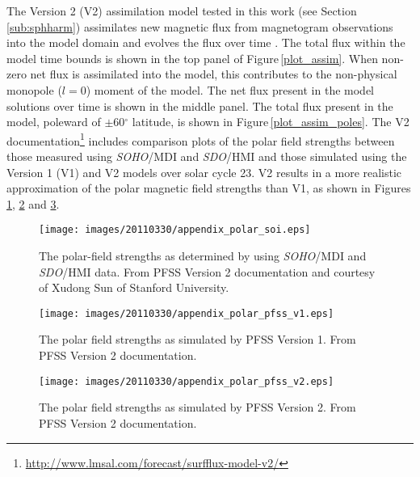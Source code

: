 \documentclass[namedreferences]{solarphysics}
\begin{document}
\begin{article}
The Version 2 (V2) assimilation model tested in this work (see Section\,\ref{sub:sphharm}) assimilates new magnetic flux from magnetogram observations into the model domain and evolves the flux over time \citep{Schrijver:2001,Schrijver:2001c}. The total flux within the model time bounds is shown in the top panel of Figure\,\ref{plot_assim}. When non-zero net flux is assimilated into the model, this contributes to the non-physical monopole ($l$$=$0) moment of the model. The net flux present in the model solutions over time is shown in the middle panel. The total flux present in the model, poleward of $\pm$60$^\circ$ latitude, is shown in Figure\,\ref{plot_assim_poles}. The V2 documentation\footnote{\url{http://www.lmsal.com/forecast/surfflux-model-v2/}} includes comparison plots of the polar field strengths between those measured using \emph{SOHO}/MDI and \emph{SDO}/HMI and those simulated using the Version 1 (V1) and V2 models over solar cycle 23. V2 results in a more realistic approximation of the polar magnetic field strengths than V1, as shown in Figures\,\ref{plot_soi_poles}, \ref{plot_pfss_poles_v1} and \ref{plot_pfss_poles_v2}.

\begin{figure}[!t]
\begin{center}
\texttt{[image: images/20110330/appendix\_polar\_soi.eps]}
\end{center}
\caption{The polar-field strengths as determined by using \emph{SOHO}/MDI and \emph{SDO}/HMI data. From PFSS Version 2 documentation and courtesy of Xudong Sun of Stanford University.}
\label{plot_soi_poles}
\end{figure}

\begin{figure}[!t]
\begin{center}
\texttt{[image: images/20110330/appendix\_polar\_pfss\_v1.eps]}
\end{center}
\caption{The polar field strengths as simulated by PFSS Version 1. From PFSS Version 2 documentation.}
\label{plot_pfss_poles_v1}
\end{figure}

\begin{figure}[!t]
\begin{center}
\texttt{[image: images/20110330/appendix\_polar\_pfss\_v2.eps]}
\end{center}
\caption{The polar field strengths as simulated by PFSS Version 2. From PFSS Version 2 documentation.}
\label{plot_pfss_poles_v2}
\end{figure}


\end{article}
\end{document}
